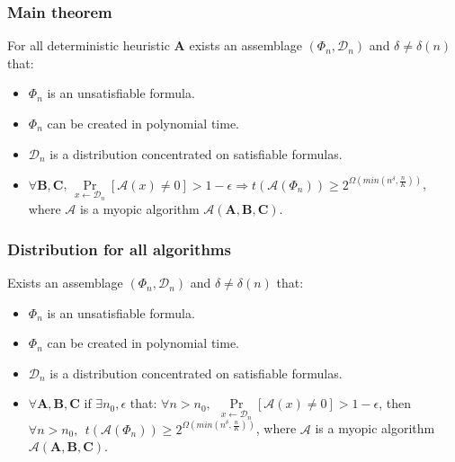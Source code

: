 \begin{frame}
	\frametitle{Main theorem}
	\pause
	\begin{theorem}
        For all deterministic heuristic $\mathbf{A}$
        exists an assemblage $(\Phi_n, \mathcal{D}_n)$ and $\delta \ne
        \delta(n)$ that:
        \pause
		\begin{itemize}
            \item $\Phi_n$ is an unsatisfiable formula.
        	\item $\Phi_n$ can be created in polynomial time.
            \pause
            \item $\mathcal{D}_n$ is a distribution concentrated on
		        satisfiable formulas.
            \pause
			\item $\forall \mathbf{B}, \mathbf{C}$,
				$\Pr\limits_{x \gets \mathcal{D}_n}[\mathcal{A}(x)
                \ne 0] > 1 - \epsilon \Rightarrow
                t(\mathcal{A}(\Phi_n)) \ge 2^{\Omega(min(n^\delta,
                \frac{n}{K}))}$, where $\mathcal{A}$ is a myopic algorithm
			    $\mathcal{A}(\mathbf{A}, \mathbf{B},\mathbf{C})$.
		\end{itemize}
	\end{theorem}
\end{frame}

\begin{frame}
    \frametitle{Distribution for all algorithms}

    \begin{theorem}
        Exists an assemblage $(\Phi_n, \mathcal{D}_n)$ and $\delta \ne
        \delta(n)$ that:
        \pause
        \begin{itemize}
            \item $\Phi_n$ is an unsatisfiable formula.
        	\item $\Phi_n$ can be created in polynomial time.
        	\pause
            \item $\mathcal{D}_n$ is a distribution concentrated on
		        satisfiable formulas.
            \pause
            \item $\forall \mathbf{A}, \mathbf{B}, \mathbf{C}$ 
		        if $\exists n_0, \epsilon$ that:
				$\forall n > n_0, ~~ \Pr\limits_{x \gets \mathcal{D}_n}[\mathcal{A}(x)
                \ne 0] > 1 - \epsilon$, then
                $\forall n > n_0, ~~ t(\mathcal{A}(\Phi_n)) \ge 2^{\Omega(min(n^\delta,
                \frac{n}{K}))}$, where $\mathcal{A}$ is a myopic algorithm
			    $\mathcal{A}(\mathbf{A}, \mathbf{B},\mathbf{C})$.
        \end{itemize}
    \end{theorem}
\end{frame}

